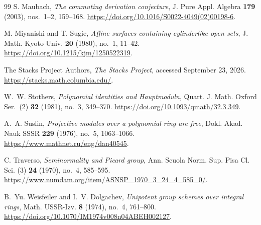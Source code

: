 \begin{thebibliography}{99}
S. Maubach,
\emph{The commuting derivation conjecture},
J. Pure Appl. Algebra \textbf{179} (2003), nos.~1--2, 159--168.
\url{https://doi.org/10.1016/S0022-4049(02)00198-6}.

M. Miyanishi and T. Sugie,
\emph{Affine surfaces containing cylinderlike open sets},
J. Math. Kyoto Univ. \textbf{20} (1980), no.~1, 11--42.
\url{https://doi.org/10.1215/kjm/1250522319}.

The Stacks Project Authors,
\emph{The Stacks Project}, accessed September 23, 2026.
\url{https://stacks.math.columbia.edu/}.

W.~W. Stothers,
\emph{Polynomial identities and Hauptmoduln},
Quart. J. Math. Oxford Ser.~(2) \textbf{32} (1981), no.~3, 349--370.
\url{https://doi.org/10.1093/qmath/32.3.349}.

A.~A. Suslin,
\emph{Projective modules over a polynomial ring are free},
Dokl. Akad. Nauk SSSR \textbf{229} (1976), no.~5, 1063--1066.
\url{https://www.mathnet.ru/eng/dan40545}.

C. Traverso,
\emph{Seminormality and Picard group},
Ann. Scuola Norm. Sup. Pisa Cl. Sci. (3) \textbf{24} (1970), no.~4,
585--595.
\url{https://www.numdam.org/item/ASNSP_1970_3_24_4_585_0/}.

\begingroup\raggedright
B.~Yu. Weisfeiler and I.~V. Dolgachev,
\emph{Unipotent group schemes over integral rings},
Math. USSR-Izv. \textbf{8} (1974), no.~4, 761--800.
\url{https://doi.org/10.1070/IM1974v008n04ABEH002127}.
\par\endgroup

\end{thebibliography}
